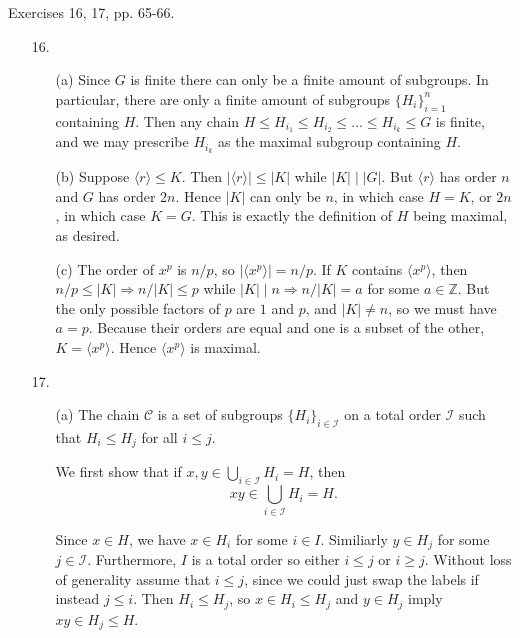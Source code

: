 \documentclass[12pt]{article}
\theoremstyle{remark}
\theoremstyle{named}
\renewcommand{\implies}{\Rightarrow}
\begin{document}
Exercises 16, 17, pp. 65-66.

\begin{enumerate}
    \item [16.] 
    \begin{enumerate}
        \item[(a)] Since \(G\) is finite there can only be a finite amount of subgroups. In particular, there are only a finite amount of subgroups \(\{H_i\}_{i = 1}^n\) containing \(H\). Then any chain \(H \le H_{i_1} \le H_{i_2} \le \dots \le H_{i_k} \le G\) is finite, and we may prescribe \(H_{i_k}\) as the maximal subgroup containing \(H\).
        
        \item[(b)] Suppose \(\langle r \rangle \le K\). Then \(|\langle r \rangle| \le |K|\) while \(|K| \mid |G|\). But \(\langle r \rangle\) has order \(n\) and \(G\) has order \(2n\). Hence \(|K|\) can only be \(n\), in which case \(H = K\), or \(2n\), in which case \(K = G\). This is exactly the definition of \(H\) being maximal, as desired.
         
        \item[(c)] The order of \(x^p\) is \(n / p\), so \(|\langle x^p \rangle| = n / p\). If \(K\) contains \(\langle x^p \rangle\), then \(n/p \le |K| \implies n / |K| \le p\) while \(|K| \mid n \implies n / |K| = a\) for some \(a \in \mathbb Z\). But the only possible factors of \(p\) are \(1\) and \(p\), and \(|K| \neq n\), so we must have \(a = p\). Because their orders are equal and one is a subset of the other, \(K = \langle x^p \rangle\). Hence \(\langle x^p \rangle\) is maximal.
    \end{enumerate}
    \item [17.] 
    \begin{enumerate}
        \item[(a)] The chain \(\mathcal C\) is a set of subgroups \(\{H_i\}_{i \in \mathcal I}\) on a total order \(\mathcal I\) such that \(H_i \le H_j\) for all \(i \le j\). 
        
        We first show that if 
        \(x, y \in \bigcup_{i \in \mathcal I} H_i = H\), then \[xy \in \bigcup_{i \in \mathcal I} H_i = H.\]

        Since \(x \in H\), we have \(x \in H_i\) for some \(i \in I\). Similiarly \(y \in H_j\) for some \(j \in \mathcal I\). Furthermore, \(I\) is a total order so either \(i \le j\) or \(i \ge j\). Without loss of generality assume that \(i \le j\), since we could just swap the labels if instead \(j \le i\). Then \(H_i \le H_j\), so \(x \in H_i \le H_j\) and \(y \in H_j\) imply \(xy \in H_j \le H\).


\end{enumerate}
\end{enumerate}
\end{document}
